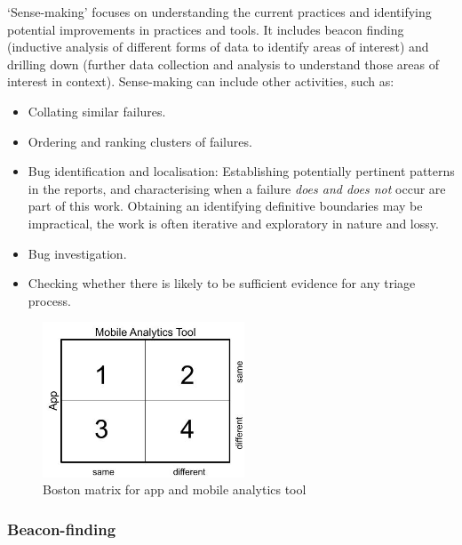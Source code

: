 `Sense-making' focuses on understanding the current practices and identifying potential improvements in practices and tools.  It includes beacon finding (inductive analysis of different forms of data to identify areas of interest) and drilling down (further data collection and analysis to understand those areas of interest in context). Sense-making can include other activities, such as:
 
 \begin{itemize}
    \itemsep0em
    \item Collating similar failures.
    \item Ordering and ranking clusters of failures.
    \item Bug identification and localisation: Establishing potentially pertinent patterns in the reports, and characterising when a failure \emph{does and does not} occur are part of this work. Obtaining an identifying definitive boundaries may be impractical, the work is often iterative and exploratory in nature and lossy. 
    \item Bug investigation.
    \item Checking whether there is likely to be sufficient evidence for any triage process.
\end{itemize}

\begin{figure}
    \centering
    \includegraphics[width=6cm]{images/my/Boston-matrix-app-and-mobile-analytics-tool.jpeg}
    \caption{Boston matrix for app and mobile analytics tool}
    \label{fig:boston-matrix-app-and-mobile-analytics-tool}
\end{figure}

\subsubsection{Beacon-finding}~\label{section-beacon-finding-method}

